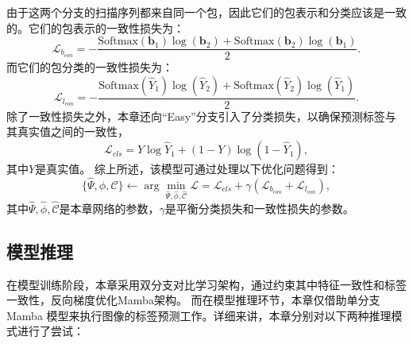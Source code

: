 由于这两个分支的扫描序列都来自同一个包，因此它们的包表示和分类应该是一致的。它们的包表示的一致性损失为：
\begin{equation}
    \mathcal{L}_{b_{con}}=-%
    \frac{\mathrm{Softmax}(\mathbf{b}_1)\log(\mathbf{b}_2)+\mathrm{Softmax}(\mathbf{b}_2)\log(\mathbf{b}_1)}{2}.
    \label{eq15}
  \end{equation}
而它们的包分类的一致性损失为：
\begin{equation}
    \mathcal{L}_{l_{con}}=-\frac{\mathrm{Softmax}(\hat{Y}_1)\log(\hat{Y}_2)+\mathrm{Softmax}(\hat{Y}_2)\log(\hat{Y}_1)}{2}.
    \label{eq16}
  \end{equation}
除了一致性损失之外，本章还向“Easy”分支引入了分类损失，以确保预测标签与其真实值之间的一致性，
\begin{equation}
	\mathcal{L}_{cls}=Y \log\hat{Y}_1+(1-Y)\log(1-\hat{Y}_1),
	\label{eq14}
\end{equation}
其中$Y$是真实值。
综上所述，该模型可通过处理以下优化问题得到：
\begin{equation}
	\{\hat{\Psi},\hat{\phi},\hat{\mathcal{C}}\}\leftarrow \arg\mathop{\min}\limits_{\hat{\Psi},\hat{\phi},\hat{\mathcal{C}}} \mathcal{L}=\mathcal{L}_{cls}+\gamma (\mathcal{L}_{b_{con}}+\mathcal{L}_{l_{con}}),
	\label{eq17}
\end{equation}
其中$\hat{\Psi},\hat{\phi},\hat{\mathcal{C}}$是本章网络的参数，$\gamma$是平衡分类损失和一致性损失的参数。

\subsection[\hspace{-2pt}模型推理]{{\heiti{} \hspace{-8pt}模型推理}}\label{section4: 模型推理}

在模型训练阶段，本章采用双分支对比学习架构，通过约束其中特征一致性和标签一致性，反向梯度优化Mamba架构。
而在模型推理环节，本章仅借助单分支 Mamba 模型来执行图像的标签预测工作。详细来讲，本章分别对以下两种推理模式进行了尝试：


